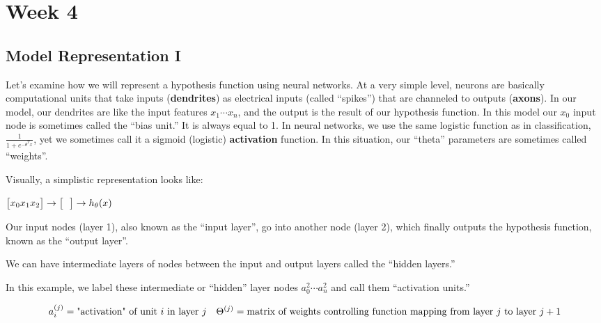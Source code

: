 \documentclass[
]{book}
\begin{document}
\hypertarget{week-4}{%
\chapter{Week 4}\label{week-4}}

\hypertarget{model-representation-i}{%
\section{Model Representation I}\label{model-representation-i}}

Let's examine how we will represent a hypothesis function using neural networks. At a very simple level, neurons are basically computational units that take inputs (\textbf{dendrites}) as electrical inputs (called ``spikes'') that are channeled to outputs (\textbf{axons}). In our model, our dendrites are like the input features \(x_1\cdots x_n\), and the output is the result of our hypothesis function. In this model our \(x_0\) input node is sometimes called the ``bias unit.'' It is always equal to 1. In neural networks, we use the same logistic function as in classification, \(\frac{1}{1 + e^{-\theta^Tx}}\), yet we sometimes call it a sigmoid (logistic) \textbf{activation} function. In this situation, our ``theta'' parameters are sometimes called ``weights''.

Visually, a simplistic representation looks like:

\(\begin{bmatrix}x_0 \newline x_1 \newline x_2 \newline \end{bmatrix}\rightarrow\begin{bmatrix}\ \ \ \newline \end{bmatrix}\rightarrow h_\theta(x)\)

Our input nodes (layer 1), also known as the ``input layer'', go into another node (layer 2), which finally outputs the hypothesis function, known as the ``output layer''.

We can have intermediate layers of nodes between the input and output layers called the ``hidden layers.''

In this example, we label these intermediate or ``hidden'' layer nodes \(a^2_0 \cdots a^2_n\) and call them ``activation units.''

\begin{align}& a_i^{(j)} = \text{"activation" of unit $i$ in layer $j$} \newline& \Theta^{(j)} = \text{matrix of weights controlling function mapping from layer $j$ to layer $j+1$}\end{align}
\end{document}
